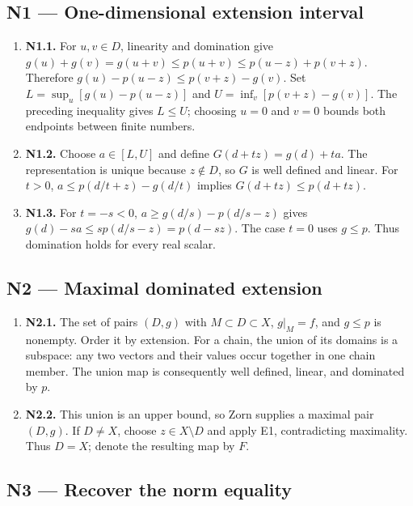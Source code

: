 \documentclass[preprint,12pt,aps,pra,showkeys,amsmath,amssymb,superscriptaddress,floatfix]{revtex4-2}
\theoremstyle{definition}
\theoremstyle{remark}
\begin{document}
\subsection{N1 --- One-dimensional extension
interval}\label{n1-one-dimensional-extension-interval}

\begin{enumerate}
\def\labelenumi{\arabic{enumi}.}
\item
  \textbf{N1.1.} For \(u,v\in D\), linearity and domination give
  \(g(u)+g(v)=g(u+v)\le p(u+v)\le p(u-z)+p(v+z)\). Therefore
  \(g(u)-p(u-z)\le p(v+z)-g(v)\). Set \(L=\sup_u[g(u)-p(u-z)]\) and
  \(U=\inf_v[p(v+z)-g(v)]\). The preceding inequality gives \(L\le U\);
  choosing \(u=0\) and \(v=0\) bounds both endpoints between finite
  numbers.
\item
  \textbf{N1.2.} Choose \(a\in[L,U]\) and define \(G(d+tz)=g(d)+ta\).
  The representation is unique because \(z\notin D\), so \(G\) is well
  defined and linear. For \(t>0\), \(a\le p(d/t+z)-g(d/t)\) implies
  \(G(d+tz)\le p(d+tz)\).
\item
  \textbf{N1.3.} For \(t=-s<0\), \(a\ge g(d/s)-p(d/s-z)\) gives
  \(g(d)-sa\le s p(d/s-z)=p(d-sz)\). The case \(t=0\) uses \(g\le p\).
  Thus domination holds for every real scalar.
\end{enumerate}

\subsection{N2 --- Maximal dominated
extension}\label{n2-maximal-dominated-extension}

\begin{enumerate}
\def\labelenumi{\arabic{enumi}.}
\item
  \textbf{N2.1.} The set of pairs \((D,g)\) with
  \(M\subset D\subset X\), \(g|_M=f\), and \(g\le p\) is nonempty. Order
  it by extension. For a chain, the union of its domains is a subspace:
  any two vectors and their values occur together in one chain member.
  The union map is consequently well defined, linear, and dominated by
  \(p\).
\item
  \textbf{N2.2.} This union is an upper bound, so Zorn supplies a
  maximal pair \((D,g)\). If \(D\ne X\), choose \(z\in X\setminus D\)
  and apply E1, contradicting maximality. Thus \(D=X\); denote the
  resulting map by \(F\).
\end{enumerate}

\subsection{N3 --- Recover the norm
equality}\label{n3-recover-the-norm-equality}
\end{document}
